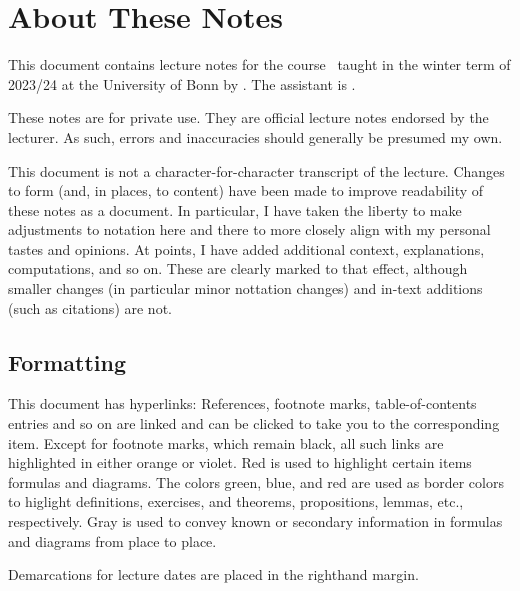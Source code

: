 \documentclass[wip, topology]{bsteffan-lecturenotes}
\subtitle{The Serre Spectral Sequence, Characteristic Classes, and Bordism}
\author{Ben Steffan}
\begin{document}
\frenchspacing 
\maketitle
\tableofcontents
\listoflectures

\setcounter{section}{-1}
\section*{About These Notes}
This document contains lecture notes for the course \makeatletter\@course\makeatother\ taught in the winter term of 2023/24 at the University of Bonn by \makeatletter\@lecturer\makeatother.
The assistant is \makeatletter\@assistant\makeatother.

These notes are for private use. 
They are  official lecture notes endorsed by the lecturer.
As such, errors and inaccuracies should generally be presumed my own. 

This document is not a character-for-character transcript of the lecture.
Changes to form (and, in places, to content) have been made to improve readability of these notes as a document.
In particular, I have taken the liberty to make adjustments to notation here and there to more closely align with my personal tastes and opinions.
At points, I have added additional context, explanations, computations, and so on.
These are clearly marked to that effect, although smaller changes (in particular minor nottation changes) and in-text additions (such as citations) are not.

\subsection*{Formatting}
This document has hyperlinks: References, footnote marks, table-of-contents entries and so on are linked and can be clicked to take you to the corresponding item.
Except for footnote marks, which remain black, all such links are highlighted in either \textcolor{linkcol}{orange} or \textcolor{citecol}{violet}. 
\textcolor{highlightcol}{Red} is used to highlight certain items formulas and diagrams.
The colors \textcolor{definitioncol}{green}, \textcolor{exercisecol}{blue}, and \textcolor{theoremcol}{red} are used as border colors to higlight definitions, exercises, and theorems, propositions, lemmas, etc., respectively.
\textcolor{knowngray}{Gray} is used to convey known or secondary information in formulas and diagrams from place to place.

Demarcations for lecture dates are placed in the righthand margin.









\printbibliography
\printindex
\end{document}
